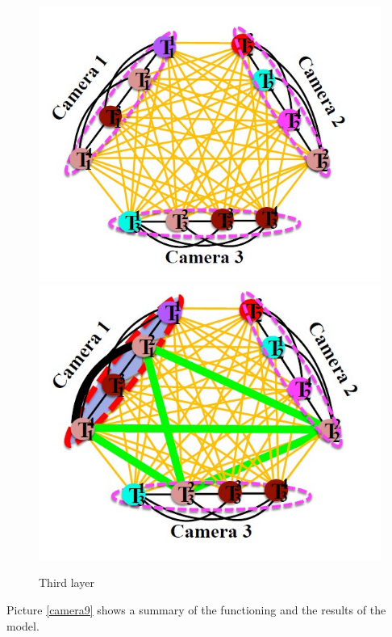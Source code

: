 \begin{enumerate}
    \begin{figure}[h!]
        \centering
        \includegraphics[scale = 1.4]{img/camera14.jpg}
        \includegraphics[scale = 1.4]{img/camera15.jpg}
        \label{camera14and15}
        \caption{Third layer}
    \end{figure}
    
\end{enumerate}

Picture \ref{camera9} shows a summary of the functioning and the results of the model.

